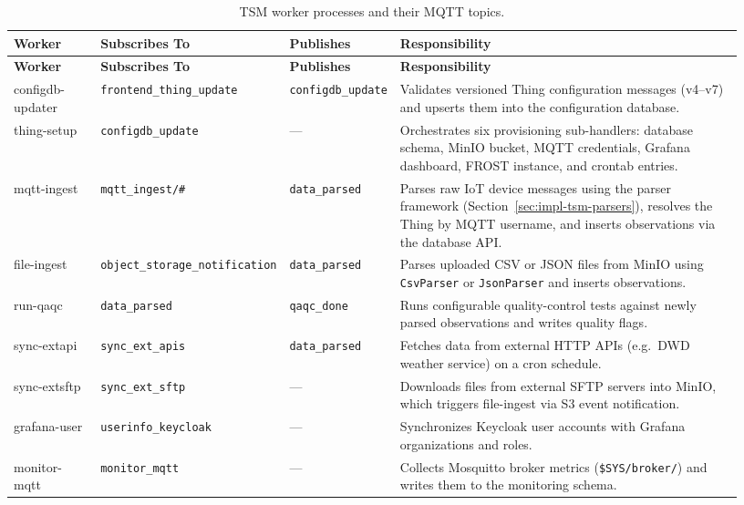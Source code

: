 \begin{landscape}
{\small
\begin{longtable}{p{0.12\linewidth} p{0.20\linewidth} p{0.13\linewidth} p{0.48\linewidth}}
  \caption{TSM worker processes and their MQTT topics.}
  \label{tab:tsm-workers} \\
  \textbf{Worker} & \textbf{Subscribes To} & \textbf{Publishes} & \textbf{Responsibility} \\
  \hline
  \endfirsthead
  \textbf{Worker} & \textbf{Subscribes To} & \textbf{Publishes} & \textbf{Responsibility} \\
  \hline
  \endhead
  configdb-updater
    & \texttt{frontend\_thing\_update}
    & \texttt{configdb\_update}
    & Validates versioned Thing configuration messages (v4--v7) and upserts them into the
      configuration database. \\[4pt]
  thing-setup
    & \texttt{configdb\_update}
    & ---
    & Orchestrates six provisioning sub-handlers: database schema, MinIO bucket, MQTT
      credentials, Grafana dashboard, FROST instance, and crontab entries. \\[4pt]
  mqtt-ingest
    & \texttt{mqtt\_ingest/\#}
    & \texttt{data\_parsed}
    & Parses raw IoT device messages using the parser framework (Section~\ref{sec:impl-tsm-parsers}),
      resolves the Thing by MQTT username, and inserts observations via the database API. \\[4pt]
  file-ingest
    & \texttt{object\_storage\_notification}
    & \texttt{data\_parsed}
    & Parses uploaded CSV or JSON files from MinIO using \texttt{CsvParser} or
      \texttt{JsonParser} and inserts observations. \\[4pt]
  run-qaqc
    & \texttt{data\_parsed}
    & \texttt{qaqc\_done}
    & Runs configurable quality-control tests against newly parsed observations and writes
      quality flags. \\[4pt]
  sync-extapi
    & \texttt{sync\_ext\_apis}
    & \texttt{data\_parsed}
    & Fetches data from external HTTP APIs (e.g.\ DWD weather service) on a cron schedule. \\[4pt]
  sync-extsftp
    & \texttt{sync\_ext\_sftp}
    & ---
    & Downloads files from external SFTP servers into MinIO, which triggers file-ingest
      via S3 event notification. \\[4pt]
  grafana-user
    & \texttt{userinfo\_keycloak}
    & ---
    & Synchronizes Keycloak user accounts with Grafana organizations and roles. \\[4pt]
  monitor-mqtt
    & \texttt{monitor\_mqtt}
    & ---
    & Collects Mosquitto broker metrics (\texttt{\$SYS/broker/}) and writes them to the
      monitoring schema. \\
\end{longtable}
}
\end{landscape}

